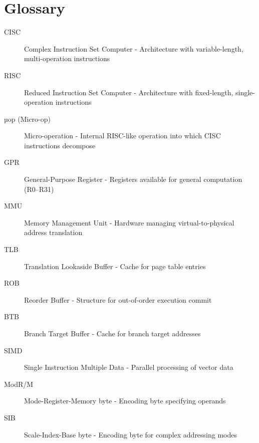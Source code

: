 \documentclass[12pt]{article}
\begin{document}
\section{Glossary}

\begin{description}
    \item[CISC] Complex Instruction Set Computer - Architecture with variable-length, multi-operation instructions
    \item[RISC] Reduced Instruction Set Computer - Architecture with fixed-length, single-operation instructions
    \item[µop (Micro-op)] Micro-operation - Internal RISC-like operation into which CISC instructions decompose
    \item[GPR] General-Purpose Register - Registers available for general computation (R0--R31)
    \item[MMU] Memory Management Unit - Hardware managing virtual-to-physical address translation
    \item[TLB] Translation Lookaside Buffer - Cache for page table entries
    \item[ROB] Reorder Buffer - Structure for out-of-order execution commit
    \item[BTB] Branch Target Buffer - Cache for branch target addresses
    \item[SIMD] Single Instruction Multiple Data - Parallel processing of vector data
    \item[ModR/M] Mode-Register-Memory byte - Encoding byte specifying operands
    \item[SIB] Scale-Index-Base byte - Encoding byte for complex addressing modes
\end{description}
\end{document}
